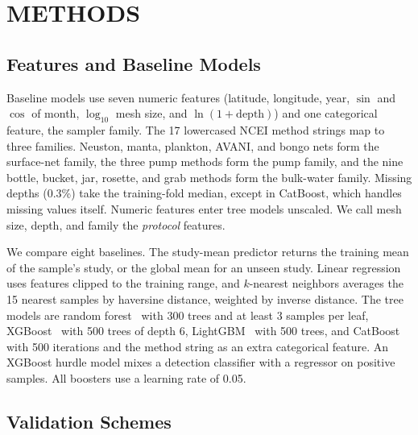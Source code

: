\documentclass[12pt,a4paper]{report}
\begin{document}
\chapter{METHODS}

\section{Features and Baseline Models}

Baseline models use seven numeric features (latitude, longitude, year, $\sin$ and $\cos$ of month, $\log_{10}$ mesh size, and $\ln(1+\text{depth})$) and one categorical feature, the sampler family. The 17 lowercased NCEI method strings map to three families. Neuston, manta, plankton, AVANI, and bongo nets form the surface-net family, the three pump methods form the pump family, and the nine bottle, bucket, jar, rosette, and grab methods form the bulk-water family. Missing depths (0.3\%) take the training-fold median, except in CatBoost, which handles missing values itself. Numeric features enter tree models unscaled. We call mesh size, depth, and family the \emph{protocol} features.

We compare eight baselines. The study-mean predictor returns the training mean of the sample's study, or the global mean for an unseen study. Linear regression uses features clipped to the training range, and $k$-nearest neighbors averages the 15 nearest samples by haversine distance, weighted by inverse distance. The tree models are random forest~\cite{breiman2001} with 300 trees and at least 3 samples per leaf, XGBoost~\cite{chen2016} with 500 trees of depth 6, LightGBM~\cite{ke2017} with 500 trees, and CatBoost~\cite{prokhorenkova2018} with 500 iterations and the method string as an extra categorical feature. An XGBoost hurdle model mixes a detection classifier with a regressor on positive samples. All boosters use a learning rate of 0.05.

\section{Validation Schemes}
\end{document}
